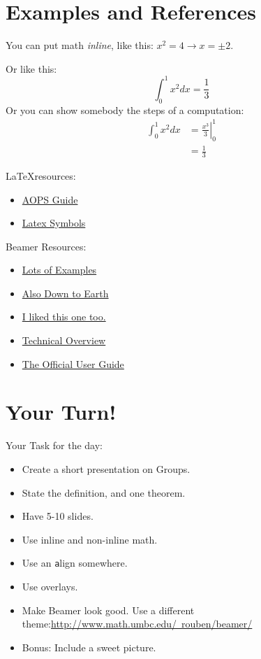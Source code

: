 \documentclass{beamer}
\begin{document}
\section{Examples and References}
\begin{frame}
You can put math {\it inline}, like this: $x^2=4\rightarrow x=\pm 2.$

Or like this:
$$ \int_0^1 x^2 dx = \frac{1}{3}$$
Or you can show somebody the steps of a computation:
\begin{align*}
\int_0^1 x^2 dx &= \left.\frac{x^3}{3}\right|_0^1\\
&= \frac{1}{3}
\end{align*}
\end{frame}

\begin{frame}
\LaTeX resources:
\begin{itemize}
\item\href{http://www.artofproblemsolving.com/Wiki/index.php/LaTeX:About}{AOPS Guide}
\item\href{http://www.artofproblemsolving.com/Wiki/index.php/LaTeX:Symbols}{Latex Symbols}
\end{itemize}
Beamer Resources:
\begin{itemize}
\item \href{http://www.tug.org/pracjourn/2005-4/mertz/mertz.pdf}{Lots of Examples}
\item \href{http://www.uncg.edu/cmp/reu/presentations/CharlesBatts-BeamerTutorial.pdf}{Also Down to Earth}
\item \href{http://en.wikibooks.org/wiki/LaTeX/Presentations}{I liked this one too.}
\item \href{http://www.math.umbc.edu/~rouben/beamer/}{Technical Overview}
\item \href{http://www.tug.org/teTeX/tetex-texmfdist/doc/latex/beamer/beameruserguide.pdf}{The Official User Guide}
\end{itemize}
\end{frame}
\section{Your Turn!}
\begin{frame}
Your Task for the day:
\begin{itemize}
\item Create a short presentation on Groups.
\item State the definition, and one theorem.
\item Have 5-10 slides.
\item Use inline and non-inline math.
\item Use an {\texttt align} somewhere.
\item Use overlays.
\item Make Beamer look good. Use a different theme:\href{See This}{http://www.math.umbc.edu/~rouben/beamer/}
\item Bonus: Include a sweet picture.
\end{itemize}
\end{frame}
\end{document}
